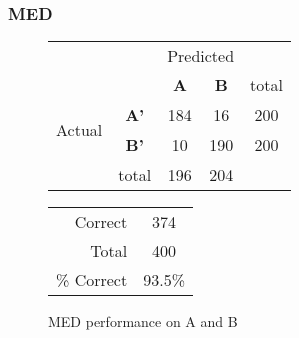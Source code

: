 \subsubsection{MED}
\begin{figure}[ht]
\begin{minipage}[b]{0.5\linewidth}
\centering
	\begin{tabular}{ccc|c|c}
	 & &\multicolumn{2}{c}{Predicted} &\\
	  & & \bf{A} &  \bf{B} & total \\
	 \cline{3-5}
	 \multirow{2}{*}{\begin{sideways}Actual\end{sideways}} & \bf{A'}& 184 & 16 & 200 \\
	 \cline{3-5}
	 & \bf{B'}& 10 & 190 & 200 \\
	  \cline{3-5}
	 &total&196&204&\\
	\end{tabular}
\end{minipage}
\hspace{0.5cm}
\begin{minipage}[b]{0.5\linewidth}
	\begin{tabular}{r|c}
	\hline
	Correct& 374\\
	Total& 400\\
	\hline
	\% Correct& 93.5\%\\
	\hline
	\end{tabular}
\end{minipage}
\vspace{1mm}
\caption{MED performance on A and B}
\end{figure}


